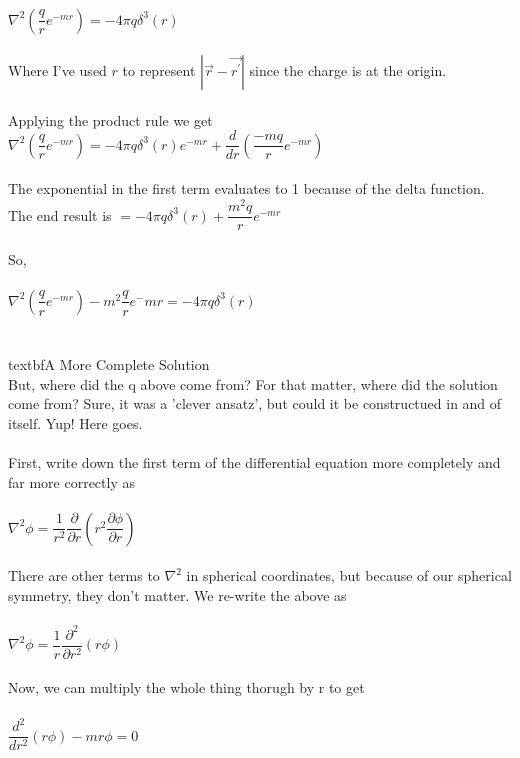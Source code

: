 \documentclass[prb,preprint]
{revtex4-1}
\begin{document}
\\
$\nabla^2\left(\dfrac{q}{r}e^{-mr}\right) = -4\pi q \delta^3(r)$
\\
\\
Where I've used $r$ to represent $|\vec{r}-\vec{r^\prime}|$ since the charge is at the origin.
\\
\\
Applying the product rule we get
$\nabla^2\left(\dfrac{q}{r}e^{-mr}\right) = -4\pi q \delta^3\left(r\right) e^{-mr} + \dfrac{d}{dr}\left(\dfrac{-mq}{r}e^{-mr}\right)$
\\
\\
The exponential in the first term evaluates to 1 because of the delta function.  The end result is 
$= -4\pi q \delta^3\left(r\right) + \dfrac{m^2q}{r}e^{-mr}$
\\
\\
So, 
\\
\\
$\nabla^2\left(\dfrac{q}{r}e^{-mr}\right) - m^2\dfrac{q}{r}e^-{mr} = -4\pi q \delta^3\left(r\right)$
\\
\\
\\textbf{A More Complete Solution}
\\
But, where did the q above come from?  For that matter, where did the solution come from?  Sure, it was a 'clever ansatz', but could it be constructued in and of itself.  Yup!  Here goes.
\\
\\
First, write down the first term of the differential equation more completely and far more correctly as 
\\
\\
$\nabla^2\phi = \dfrac{1}{r^2}\dfrac{\partial}{\partial r} \left(r^2\dfrac{\partial\phi}{\partial r}\right)$
\\
\\
There are other terms to $\nabla^2$ in spherical coordinates, but because of our spherical symmetry, they don't matter.  We re-write the above as 
\\
\\
$\nabla^2\phi = \dfrac{1}{r}\dfrac{\partial^2}{\partial r^2} \left(r\phi\right)$
\\
\\
Now, we can multiply the whole thing thorugh by r to get 
\\
\\
$\dfrac{d^2}{d r^2}\left(r\phi\right) - mr\phi = 0$
\\
\\
\end{document}
